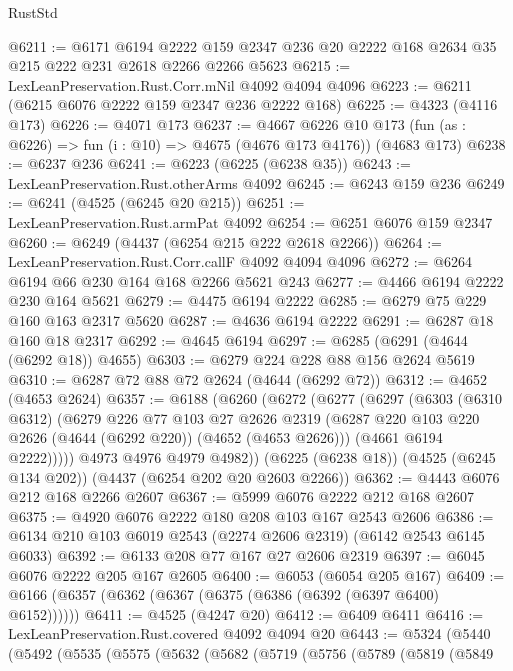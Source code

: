 \begin{lexlean}{RustStd}
\begin{coremodule}
{\begin{coremodule}
{{{{{{{{{{{{{{@6211 := @6171
    @6194
    @2222
    @159
    @2347
    @236
    @20
    @2222
    @168
    @2634
    @35
    @215
    @222
    @231
    @2618
    @2266
    @2266
    @5623
@6215 := LexLeanPreservation.Rust.Corr.mNil @4092 @4094 @4096
@6223 := @6211 (@6215 @6076 @2222 @159 @2347 @236 @2222 @168)
@6225 := @4323 (@4116 @173)
@6226 := @4071 @173
@6237 := @4667
    @6226
    @10
    @173
    (fun (as : @6226) => fun (i : @10) => @4675 (@4676 @173 @4176))
    (@4683 @173)
@6238 := @6237 @236
@6241 := @6223 (@6225 (@6238 @35))
@6243 := LexLeanPreservation.Rust.otherArms @4092
@6245 := @6243 @159 @236
@6249 := @6241 (@4525 (@6245 @20 @215))
@6251 := LexLeanPreservation.Rust.armPat @4092
@6254 := @6251 @6076 @159 @2347
@6260 := @6249 (@4437 (@6254 @215 @222 @2618 @2266))
@6264 := LexLeanPreservation.Rust.Corr.callF @4092 @4094 @4096
@6272 := @6264 @6194 @66 @230 @164 @168 @2266 @5621 @243
@6277 := @4466 @6194 @2222 @230 @164 @5621
@6279 := @4475 @6194 @2222
@6285 := @6279 @75 @229 @160 @163 @2317 @5620
@6287 := @4636 @6194 @2222
@6291 := @6287 @18 @160 @18 @2317
@6292 := @4645 @6194
@6297 := @6285 (@6291 (@4644 (@6292 @18)) @4655)
@6303 := @6279 @224 @228 @88 @156 @2624 @5619
@6310 := @6287 @72 @88 @72 @2624 (@4644 (@6292 @72))
@6312 := @4652 (@4653 @2624)
@6357 := @6188
    (@6260
      (@6272
        (@6277
          (@6297
            (@6303
              (@6310 @6312)
              (@6279
                @226
                @77
                @103
                @27
                @2626
                @2319
                (@6287 @220 @103 @220 @2626 (@4644 (@6292 @220)) (@4652 (@4653 @2626)))
                (@4661 @6194 @2222)))))
        @4973
        @4976
        @4979
        @4982))
    (@6225 (@6238 @18))
    (@4525 (@6245 @134 @202))
    (@4437 (@6254 @202 @20 @2603 @2266))
@6362 := @4443 @6076 @212 @168 @2266 @2607
@6367 := @5999 @6076 @2222 @212 @168 @2607
@6375 := @4920 @6076 @2222 @180 @208 @103 @167 @2543 @2606
@6386 := @6134 @210 @103 @6019 @2543 (@2274 @2606 @2319) (@6142 @2543 @6145 @6033)
@6392 := @6133 @208 @77 @167 @27 @2606 @2319
@6397 := @6045 @6076 @2222 @205 @167 @2605
@6400 := @6053 (@6054 @205 @167)
@6409 := @6166 (@6357 (@6362 (@6367 (@6375 (@6386 (@6392 (@6397 @6400) @6152))))))
@6411 := @4525 (@4247 @20)
@6412 := @6409 @6411
@6416 := LexLeanPreservation.Rust.covered @4092 @4094 @20
@6443 := @5324
    (@5440
      (@5492
        (@5535
          (@5575
            (@5632
              (@5682
                (@5719
                  (@5756
                    (@5789
                      (@5819
                        (@5849
}}}}}}}}}}}}}}
\end{coremodule}}
\end{coremodule}
\end{lexlean}
